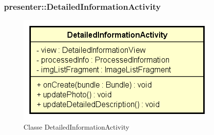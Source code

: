 \documentclass[../DefinizioneDiProdotto.tex]{subfiles}
\begin{document}
\subsubsection{presenter::DetailedInformationActivity}

    \begin{figure}[H]
        \centering
        \includegraphics{img/DetailedInformationActivity.png}
        \caption{Classe DetailedInformationActivity}\label{fig:presenter::DetailedInformationActivity} 
    \end{figure}
\end{document}
